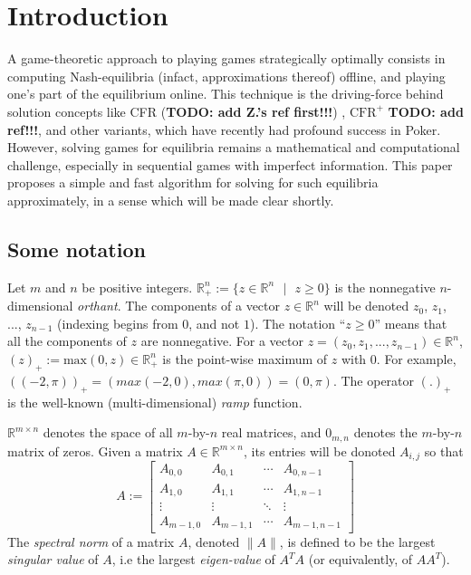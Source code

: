 \documentclass[12pt]{article}
\begin{document}
\section{Introduction}
\label{sec:intro}
A game-theoretic approach to playing games strategically optimally consists in computing Nash-equilibria (infact, approximations thereof) offline, and playing one's part of the equilibrium online. This technique is the driving-force behind solution concepts like CFR (\textbf{TODO: add Z.'s ref first!!!}) \cite{lanctot2009monte}, $\text{CFR}^{+}$ \textbf{TODO: add ref!!!}, and other variants, which have recently had profound success in Poker. However, solving games for equilibria remains a mathematical and computational challenge, especially in sequential games with imperfect information. This paper proposes a simple and fast algorithm for solving for such equilibria approximately, in a sense which will be made clear shortly.

\subsection{Some notation}
Let $m$ and $n$ be positive integers.
$\mathbb{R}^{n}_+ := \{z \in \mathbb{R}^{n}\text{ }|\text{ } z \geq 0\}$ is the nonnegative $n$-dimensional \textit{orthant}.  The components of a vector $z \in \mathbb{R}^n$ will be denoted $z_0$, $z_1$, ..., $z_{n-1}$ (indexing begins from $0$, and not $1$). The notation ``$z \ge 0$'' means that all the components of $z$ are nonnegative. For a vector $z = (z_0, z_1, ..., z_{n-1}) \in \mathbb{R}^n$, %
$(z)_+:=\text{max}(0, z) \in \mathbb{R}^{n}_+$ is the point-wise maximum of $z$ with $0$. For example, $((-2, \pi))_+ = (max(-2, 0), max(\pi, 0)) = (0, \pi)$.  The operator $(.)_+$ is the well-known (multi-dimensional) \textit{ramp} function.

$\mathbb{R}^{m \times n}$ denotes the space of all $m$-by-$n$ real matrices, and $0_{m,n}$ denotes the $m$-by-$n$ matrix of zeros. Given a matrix $A \in \mathbb{R}^{m \times n}$, its entries will be donoted $A_{i,j}$ so that
\[
A :=\left[
\begin{array}{cccc}
A_{0,0} & A_{0,1} & \cdots & A_{0,n-1} \\
A_{1,0} & A_{1,1} & \cdots & A_{1,n-1} \\
\vdots & \vdots & \ddots & \vdots\\
A_{m-1,0} & A_{m-1,1} & \cdots & A_{m-1,n-1}
\end{array}\right]
\]
The \textit{spectral norm} of a matrix $A$, denoted $\|A\|$, is defined to be the largest \textit{singular value} of $A$, i.e the largest \textit{eigen-value} of $A^TA$ (or equivalently, of $AA^T$).
\end{document}
